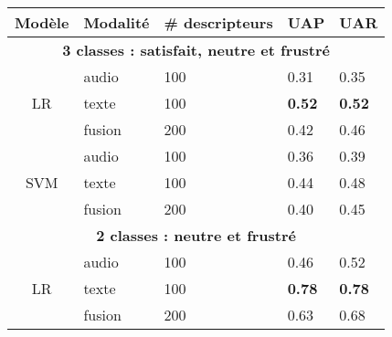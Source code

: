 \begin{table}[]
  \centering
\begin{tabular}{|c|l|l|l|l|}
\hline
\multicolumn{1}{|l|}{Modèle}               & \multicolumn{1}{l|}{Modalité} & \multicolumn{1}{l|}{\# descripteurs} & \multicolumn{1}{l|}{UAP}           & UAR           \\ \hline
\multicolumn{5}{|c|}{\textbf{3 classes : satisfait, neutre et frustré}}                                                                                                \\ \hline
\multicolumn{1}{|c|}{\multirow{3}{*}{LR}}  & \multicolumn{1}{l|}{audio}    & \multicolumn{1}{l|}{100}             & \multicolumn{1}{l|}{0.31}          & 0.35          \\ \cline{2-5}
\multicolumn{1}{|c|}{}                     & \multicolumn{1}{l|}{texte}    & \multicolumn{1}{l|}{100}             & \multicolumn{1}{l|}{\textbf{0.52}} & \textbf{0.52} \\ \cline{2-5}
\multicolumn{1}{|c|}{}                     & \multicolumn{1}{l|}{fusion}   & \multicolumn{1}{l|}{200}             & \multicolumn{1}{l|}{0.42}          & 0.46          \\ \hline
\multicolumn{1}{|c|}{\multirow{3}{*}{SVM}} & \multicolumn{1}{l|}{audio}    & \multicolumn{1}{l|}{100}             & \multicolumn{1}{l|}{0.36}          & 0.39          \\ \cline{2-5}
\multicolumn{1}{|c|}{}                     & \multicolumn{1}{l|}{texte}    & \multicolumn{1}{l|}{100}             & \multicolumn{1}{l|}{0.44}          & 0.48          \\ \cline{2-5}
\multicolumn{1}{|c|}{}                     & \multicolumn{1}{l|}{fusion}   & \multicolumn{1}{l|}{200}             & \multicolumn{1}{l|}{0.40}          & 0.45          \\ \hline
\multicolumn{5}{|c|}{\textbf{2 classes : neutre et frustré}}                                                                                                           \\ \hline
\multicolumn{1}{|c|}{\multirow{3}{*}{LR}}  & \multicolumn{1}{l|}{audio}    & \multicolumn{1}{l|}{100}             & \multicolumn{1}{l|}{0.46}          & 0.52          \\ \cline{2-5}
\multicolumn{1}{|c|}{}                     & \multicolumn{1}{l|}{texte}    & \multicolumn{1}{l|}{100}             & \multicolumn{1}{l|}{\textbf{0.78}} & \textbf{0.78} \\ \cline{2-5}
\multicolumn{1}{|c|}{}                     & \multicolumn{1}{l|}{fusion}   & \multicolumn{1}{l|}{200}             & \multicolumn{1}{l|}{0.63}          & 0.68          \\ \hline

\end{tabular}
\end{table}
